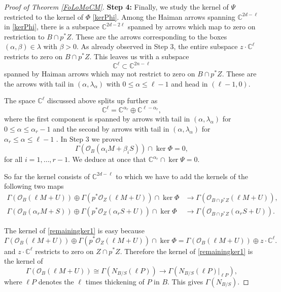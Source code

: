 \documentclass{amsart}
\theoremstyle{definition}
\newcommand{\CC} {\mathbb{C}}          %
\renewcommand{\O}{\mathcal{O}}
\begin{document}
\begin{proof}[Proof of Theorem \ref{FoLoMoCM}]
\noindent \textbf{Step 4:} Finally, we study the kernel of $\Psi$ restricted to the kernel of $\Phi$ \eqref{kerPhi}. Among the Haiman arrows spanning $\CC^{2d-\ell}$ in \eqref{kerPhi}, there is a subspace $\CC^{2d-2\ell}$ spanned by arrows which map to zero on restriction to $B \cap p^*Z$. These are the arrows corresponding to the boxes $(\alpha,\beta) \in \lambda$ with $\beta>0$. As already observed in Step 3, the entire subspace $z \cdot \CC^{\ell}$ restricts to zero on $B \cap p^*Z$. This leaves us with a subspace 
\[
\CC^{\ell} \subset \CC^{2n-\ell}
\] 
spanned by Haiman arrows which may not restrict  to zero on $B \cap p^* Z$. These are the arrows with tail in $(\alpha,\lambda_\alpha)$ with $0 \leq \alpha \leq \ell-1$ and head in $(\ell-1,0)$. 

The space $\CC^{\ell}$ discussed above splits up further as
\[
\CC^{\ell} = \CC^{\alpha_r} \oplus \CC^{\ell - \alpha_r},
\]
where the first component is spanned by arrows with tail in $(\alpha,\lambda_\alpha)$ for $0 \leq \alpha \leq \alpha_r-1$ and the second by arrows with tail in $(\alpha,\lambda_\alpha)$ for $\alpha_r \leq \alpha \leq \ell-1$ . In Step 3 we proved 
\[
\Gamma(\O_B(\alpha_i M + \beta_i S)) \cap \ker \Phi = 0, 
\]
for all $i=1, \ldots, r-1$. We deduce at once that $\CC^{\alpha_r} \cap \ker \Psi = 0$. 

So far the kernel consists of $\CC^{2d - \ell}$ to which we have to add the kernels of the following two maps
\begin{align}
\Gamma(\O_B(\ell M + U)) \oplus \Gamma(p^* \O_Z(\ell M + U)) \cap \ker \Phi &\rightarrow \Gamma(\O_{B \cap p^*Z}(\ell M + U)), \label{remainingker1} \\
\Gamma(\O_B(\alpha_r M + S)) \oplus \Gamma(p^* \O_Z(\alpha_r S + U)) \cap \ker \Phi &\rightarrow  \Gamma(\O_{B \cap p^*Z}(\alpha_r S + U)). \label{remainingker2}
\end{align}

The kernel of \eqref{remainingker1} is easy because 
\[
\Gamma(\O_B(\ell M + U)) \oplus \Gamma(p^* \O_Z(\ell M + U)) \cap \ker \Phi  = \Gamma(\O_B(\ell M + U)) \oplus z \cdot \CC^{\ell}.
\]
and $z \cdot \CC^{\ell}$ restricts to zero on $Z \cap p^*Z$. Therefore the kernel of \eqref{remainingker1} is the kernel of
\[
\Gamma(\O_B(\ell M + U)) \cong \Gamma(N_{B/S}(\ell P)) \rightarrow \Gamma(N_{B/S}(\ell P)|_{\ell P}),
\]
where $\ell P$ denotes the $\ell$ times thickening of $P$ in $B$. This gives $\Gamma(N_{B/S})$.


\end{proof}
\end{document}
